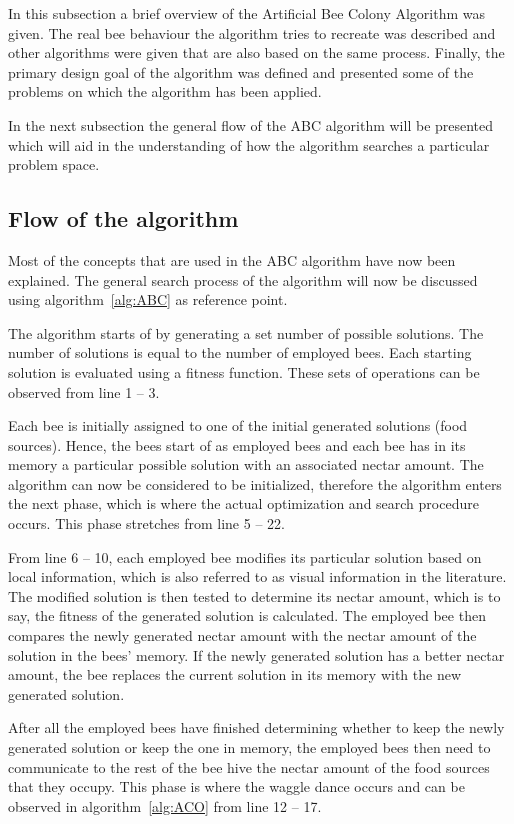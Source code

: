 In this subsection a brief overview of the Artificial Bee Colony Algorithm was given. The real bee behaviour the algorithm tries to recreate was described and other algorithms were given that are also based on the same process. Finally, the primary design goal of the algorithm was defined and presented some of the problems on which the algorithm has been applied.

In the next subsection the general flow of the ABC algorithm will be presented which will aid in the understanding of how the algorithm searches a particular problem space. 
\subsection{Flow of the algorithm}
Most of the concepts that are used in the ABC algorithm have now been explained. The general search process of the algorithm will now be discussed using algorithm~\ref{alg:ABC} as reference point.

The algorithm starts of by generating a set number of possible solutions. The number of solutions is equal to the number of employed bees. Each starting solution is evaluated using a fitness function. These sets of operations can be observed from line 1 -- 3.

Each bee is initially assigned to one of the initial generated solutions (food sources). Hence, the bees start of as employed bees and each bee has in its memory a particular possible solution with an associated nectar amount. The algorithm can now be considered to be initialized, therefore the algorithm enters the next phase, which is where the actual optimization and search procedure occurs. This phase stretches from line 5 -- 22.

From line 6 -- 10, each employed bee modifies its particular solution based on local information, which is also referred to as visual information in the literature. The modified solution is then tested to determine its nectar amount, which is to say, the fitness of the generated solution is calculated. The employed bee then compares the newly generated nectar amount with the nectar amount of the solution in the bees' memory. If the newly generated solution has a better nectar amount, the bee replaces the current solution in its memory with the new generated solution.

After all the employed bees have finished determining whether to keep the newly generated solution or keep the one in memory, the employed bees then need to communicate to the rest of the bee hive the nectar amount of the food sources that they occupy. This phase is where the waggle dance occurs and can be observed in algorithm~\ref{alg:ACO} from line 12 -- 17.

